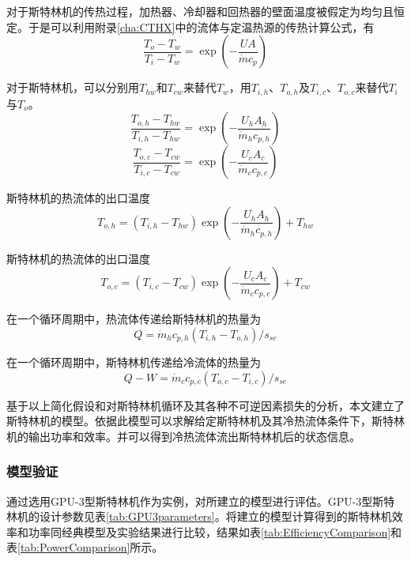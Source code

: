 对于斯特林机的传热过程，加热器、冷却器和回热器的壁面温度被假定为均匀且恒定。于是可以利用附录\ref{cha:CTHX}中的流体与定温热源的传热计算公式，有
\begin{equation}
	\frac{T_o-T_w}{T_i-T_w}=\exp(-\frac{UA}{\dot{m}c_p})
\end{equation}

对于斯特林机，可以分别用$T_{hw}$和$T_{cw}$来替代$T_w$，用$T_{i,h}$、$T_{o,h}$及$T_{i,c}$、$T_{o,c}$来替代$T_{i}$与$T_{o}$。
\begin{equation}
	\frac{T_{o,h}-T_{hw}}{T_{i,h}-T_{hw}}=\exp(-\frac{U_hA_h}{\dot{m}_hc_{p,h}})
	\label{eq:T_h}
\end{equation}
\begin{equation}
	\frac{T_{o,c}-T_{cw}}{T_{i,c}-T_{cw}}=\exp(-\frac{U_cA_c}{\dot{m}_cc_{p,c}})
	\label{eq:T_c}
\end{equation}

斯特林机的热流体的出口温度
\begin{equation}
	T_{o,h}=(T_{i,h}-T_{hw})\exp(-\frac{U_hA_h}{\dot{m}_hc_{p,h}}) + T_{hw}
	\label{eq:T_o_h}
\end{equation}

斯特林机的热流体的出口温度
\begin{equation}
	T_{o,c}=(T_{i,c}-T_{cw})\exp(-\frac{U_cA_c}{\dot{m}_cc_{p,c}}) + T_{cw}
	\label{eq:T_o_c}
\end{equation}

在一个循环周期中，热流体传递给斯特林机的热量为
\begin{equation}
	Q = \dot{m}_hc_{p,h}(T_{i,h}-T_{o,h})/s_{se}
	\label{eq:q_h}
\end{equation}

在一个循环周期中，斯特林机传递给冷流体的热量为
\begin{equation}
	 Q - W = \dot{m}_cc_{p,c}(T_{o,c}-T_{i,c})/s_{se}	\label{eq:q_c}
\end{equation}

基于以上简化假设和对斯特林机循环及其各种不可逆因素损失的分析，本文建立了斯特林机的模型。依据此模型可以求解给定斯特林机及其冷热流体条件下，斯特林机的输出功率和效率。并可以得到冷热流体流出斯特林机后的状态信息。

\subsubsection{模型验证}
\label{sec:modelValidation}

通过选用GPU-3型斯特林机作为实例，对所建立的模型进行评估。GPU-3型斯特林机的设计参数见表\ref{tab:GPU3parameters}\cite{Babaelahi2015,Martini1983}。将建立的模型计算得到的斯特林机效率和功率同经典模型及实验结果进行比较，结果如表\ref{tab:EfficiencyComparison}和表\ref{tab:PowerComparison}所示。

